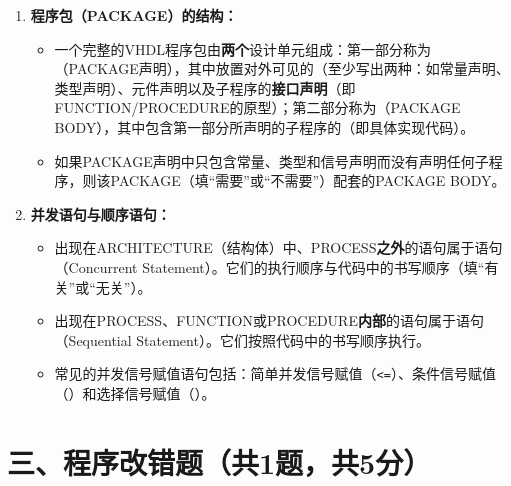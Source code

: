 \begin{enumerate}[label=\arabic*.]
\vspace{0.6cm}

\item \textbf{程序包（PACKAGE）的结构：}
\begin{itemize}
  \item 一个完整的VHDL程序包由\textbf{两个}设计单元组成：第一部分称为\underline{\hspace{3cm}}（PACKAGE声明），其中放置对外可见的\underline{\hspace{2.5cm}}（至少写出两种：如常量声明、类型声明）、元件声明以及子程序的\textbf{接口声明}（即FUNCTION/PROCEDURE的原型）；第二部分称为\underline{\hspace{3cm}}（PACKAGE BODY），其中包含第一部分所声明的子程序的\underline{\hspace{2.5cm}}（即具体实现代码）。
  \item 如果PACKAGE声明中只包含常量、类型和信号声明而没有声明任何子程序，则该PACKAGE\underline{\hspace{2cm}}（填“需要”或“不需要”）配套的PACKAGE BODY。
\end{itemize}

\vspace{0.6cm}

\item \textbf{并发语句与顺序语句：}
\begin{itemize}
  \item 出现在ARCHITECTURE（结构体）中、PROCESS\textbf{之外}的语句属于\underline{\hspace{2.5cm}}语句（Concurrent Statement）。它们的执行顺序与代码中的书写顺序\underline{\hspace{2.5cm}}（填“有关”或“无关”）。
  \item 出现在PROCESS、FUNCTION或PROCEDURE\textbf{内部}的语句属于\underline{\hspace{2.5cm}}语句（Sequential Statement）。它们按照代码中的书写顺序\underline{\hspace{2.5cm}}执行。
  \item 常见的并发信号赋值语句包括：简单并发信号赋值（\texttt{<=}）、条件信号赋值（\underline{\hspace{2.5cm}}）和选择信号赋值（\underline{\hspace{2.5cm}}）。
\end{itemize}

\end{enumerate}

\newpage

\section*{三、程序改错题（共1题，共5分）}

